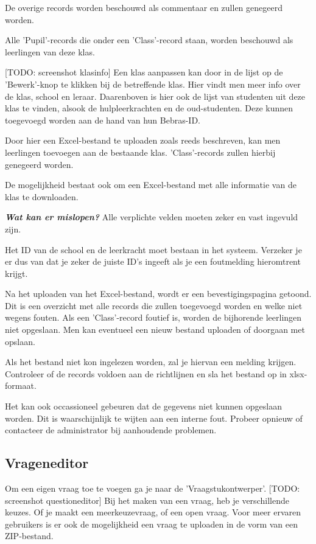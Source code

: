 \documentclass[]{article}
\begin{document}
De overige records worden beschouwd als commentaar en zullen genegeerd worden.

Alle 'Pupil'-records die onder een 'Class'-record staan, worden beschouwd als leerlingen van deze klas. 

[TODO: screenshot klasinfo]
Een klas aanpassen kan door in de lijst op de 'Bewerk'-knop te klikken bij de betreffende klas. Hier vindt men meer info over de klas, school en leraar. Daarenboven is hier ook de lijst van studenten uit deze klas te vinden, alsook de hulpleerkrachten en de oud-studenten. Deze kunnen toegevoegd worden aan de hand van hun Bebras-ID.

Door hier een Excel-bestand te uploaden zoals reeds beschreven, kan men leerlingen toevoegen aan de bestaande klas. 'Class'-records zullen hierbij genegeerd worden.

De mogelijkheid bestaat ook om een Excel-bestand met alle informatie van de klas te downloaden.

\textbf{\textit{Wat kan er mislopen?}}
Alle verplichte velden moeten zeker en vast ingevuld zijn.

Het ID van de school en de leerkracht moet bestaan in het systeem. Verzeker je er dus van dat je zeker de juiste ID's ingeeft als je een foutmelding hieromtrent krijgt.

Na het uploaden van het Excel-bestand, wordt er een bevestigingspagina getoond. Dit is een overzicht met alle records die zullen toegevoegd worden en welke niet wegens fouten. Als een 'Class'-record foutief is, worden de bijhorende leerlingen niet opgeslaan. Men kan eventueel een nieuw bestand uploaden of doorgaan met opslaan.

Als het bestand niet kon ingelezen worden, zal je hiervan een melding krijgen. Controleer of de records voldoen aan de richtlijnen en sla het bestand op in xlsx-formaat.

Het kan ook occassioneel gebeuren dat de gegevens niet kunnen opgeslaan worden. Dit is waarschijnlijk te wijten aan een interne fout. Probeer opnieuw of contacteer de administrator bij aanhoudende problemen. 

\subsection{Vrageneditor}

Om een eigen vraag toe te voegen ga je naar de 'Vraagstukontwerper'. [TODO: screenshot questioneditor] Bij het maken van een vraag, heb je verschillende keuzes. Of je maakt een meerkeuzevraag, of een open vraag. Voor meer ervaren gebruikers is er ook de mogelijkheid een vraag te uploaden in de vorm van een ZIP-bestand.
\end{document}
